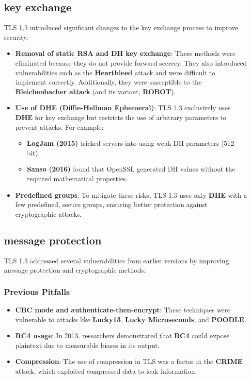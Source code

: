 \subsection{ key exchange}

TLS 1.3 introduced significant changes to the key exchange process to improve security:

\begin{itemize}
    \item \textbf{Removal of static RSA and DH key exchange}: These methods were eliminated because they do not provide forward secrecy. They also introduced vulnerabilities such as the \textbf{Heartbleed} attack and were difficult to implement correctly. Additionally, they were susceptible to the \textbf{Bleichenbacher attack} (and its variant, \textbf{ROBOT}).
    
    \item \textbf{Use of DHE (Diffie-Hellman Ephemeral)}: TLS 1.3 exclusively uses \textbf{DHE} for key exchange but restricts the use of arbitrary parameters to prevent attacks. For example:
        \begin{itemize}[itemsep=0pt]
            \item \textbf{LogJam (2015)} tricked servers into using weak DH parameters (512-bit).
            \item \textbf{Sanso (2016)} found that OpenSSL generated DH values without the required mathematical properties.
        \end{itemize}
    
    \item \textbf{Predefined groups}: To mitigate these risks, TLS 1.3 uses only \textbf{DHE} with a few predefined, secure groups, ensuring better protection against cryptographic attacks.
\end{itemize}


\subsection{message protection}

TLS 1.3 addressed several vulnerabilities from earlier versions by improving message protection and cryptographic methods:

\subsubsection{Previous Pitfalls}
\begin{itemize}
    \item \textbf{CBC mode and authenticate-then-encrypt}: These techniques were vulnerable to attacks like \textbf{Lucky13}, \textbf{Lucky Microseconds}, and \textbf{POODLE}.
    \item \textbf{RC4 usage}: In 2013, researchers demonstrated that \textbf{RC4} could expose plaintext due to measurable biases in its output.
    \item \textbf{Compression}: The use of compression in TLS was a factor in the \textbf{CRIME} attack, which exploited compressed data to leak information.
\end{itemize}

